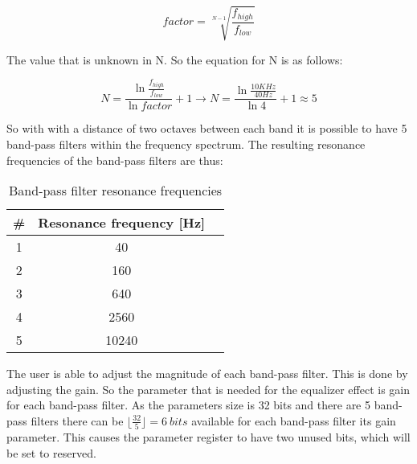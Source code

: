 \begin{equation}
    factor=\sqrt[N-1]{\frac{f_{high}}{f_{low}}}
\end{equation}

The value that is unknown in N. So the equation for N is as follows: 

\begin{equation}
    N=\frac{\ln\frac{f_{high}}{f_{low}}}{\ln{factor}}+1\rightarrow N=\frac{\ln\frac{10KHz}{40Hz}}{\ln{4}}+1\approx 5
\end{equation}

So with with a distance of two octaves between each band it is possible to have 5 band-pass filters within the frequency spectrum. The resulting resonance frequencies of the band-pass filters are thus: 

\begin{table}[h!]
    \centering
    \begin{tabular}{|c|c|c|}
        \hline
        \# & Resonance frequency [Hz]\\
        \hline
        1 & 40\\
        \hline
        2 & 160\\
        \hline
        3 & 640\\
        \hline
        4 & 2560\\
        \hline
        5 & 10240\\
        \hline
    \end{tabular}
    \caption{Band-pass filter resonance frequencies}
    \label{table:bpf-filters-frequencies}
\end{table}

The user is able to adjust the magnitude of each band-pass filter. This is done by adjusting the gain. So the parameter that is needed for the equalizer effect is gain for each band-pass filter. As the parameters size is 32 bits and there are 5 band-pass filters there can be $\lfloor\frac{32}{5}\rfloor=6\ bits$ available for each band-pass filter its gain parameter. This causes the parameter register to have two unused bits, which will be set to reserved.

